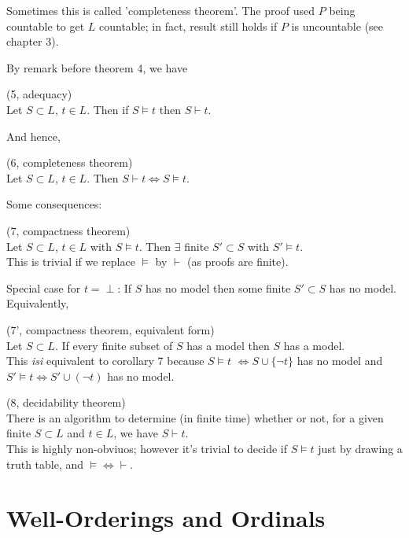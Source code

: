 \documentclass[a4paper]{article}
\begin{document}
\begin{rem}
Sometimes this is called 'completeness theorem'. The proof used $P$ being countable to get $L$ countable; in fact, result still holds if $P$ is uncountable (see chapter 3).
\end{rem}

By remark before theorem 4, we have
\begin{coro} (5, adequacy)\\
Let $S \subset L$, $t \in L$. Then if $S \vDash t$ then $S \vdash t$.
\end{coro}

And hence,
\begin{thm} (6, completeness theorem)\\
Let $S \subset L$, $t \in L$. Then $S \vdash t \iff S \vDash t$.
\end{thm}

Some consequences:
\begin{coro} (7, compactness theorem)\\
Let $S \subset L$, $t \in L$ with $S \vDash t$. Then $\exists$ finite $S' \subset S$ with $S' \vDash t$.\\
This is trivial if we replace $\vDash$ by $\vdash$ (as proofs are finite).
\end{coro}

Special case for $t=\perp$: If $S$ has no model then some finite $S' \subset S$ has no model. Equivalently,
\begin{coro} (7', compactness theorem, equivalent form)\\
Let $S \subset L$. If every finite subset of $S$ has a model then $S$ has a model.\\
This \emph{isi} equivalent to corollary 7 because $S \vDash t$ $\iff S \cup \{\neg t\}$ has no model and $S' \vDash t \iff S' \cup (\neg t)$ has no model.
\end{coro}

\begin{coro} (8, decidability theorem)\\
There is an algorithm to determine (in finite time) whether or not, for a given finite $S \subset L$ and $t \in L$, we have $S \vdash t$.\\
This is highly non-obviuos; however it's trivial to decide if $S \vDash t$ just by drawing a truth table, and $\vDash \iff \vdash$.
\end{coro}

\newpage

\section{Well-Orderings and Ordinals}
\end{document}
